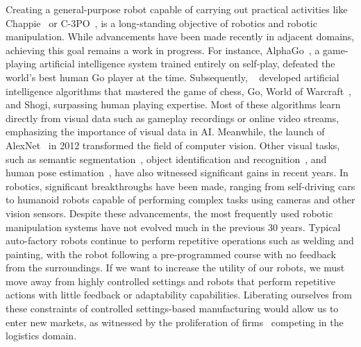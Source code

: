 Creating a general-purpose robot capable of carrying out practical activities like Chappie~\cite{blomkamp2015chappie} or C-3PO~\cite{lucas1977star},
is a long-standing objective of robotics and robotic manipulation. While advancements have been made recently in adjacent domains,
achieving this goal remains a work in progress. For instance, AlphaGo~\cite{silver2018general},
a game-playing artificial intelligence system trained entirely on self-play, defeated
the world's best human Go player at the time. Subsequently, \citeauthor{silver2016mastering}~\cite{silver2016mastering}
developed artificial intelligence algorithms that mastered the game of chess, Go, World of Warcraft~\cite{entertainment2013world}, and Shogi,
surpassing human playing expertise. Most of these algorithms learn directly from visual data such as gameplay
recordings or online video streams, emphasizing the importance of visual data in AI.
Meanwhile, the launch of AlexNet~\cite{krizhevsky2017imagenet} in 2012 transformed the field of computer vision.
Other visual tasks, such as semantic segmentation~\cite{long2015fully}, object identification and recognition~\cite{he2017mask},
and human pose estimation~\cite{guler2018densepose}, have also witnessed significant gains in recent years. In robotics, significant
breakthroughs have been made, ranging from self-driving cars to humanoid robots capable of performing complex tasks using cameras
and other vision sensors. Despite these advancements, the most frequently used robotic manipulation systems have not evolved much
in the previous 30 years. Typical auto-factory robots continue to perform repetitive operations such as welding and painting,
with the robot following a pre-programmed course with no feedback from the surroundings. If we want to increase the utility of our robots,
we must move away from highly controlled settings and robots that perform repetitive
actions with little feedback or adaptability capabilities. Liberating ourselves from these constraints of controlled settings-based
manufacturing would allow us to enter new markets, as witnessed by the proliferation of firms~\cite{sereact} competing in the logistics domain.


